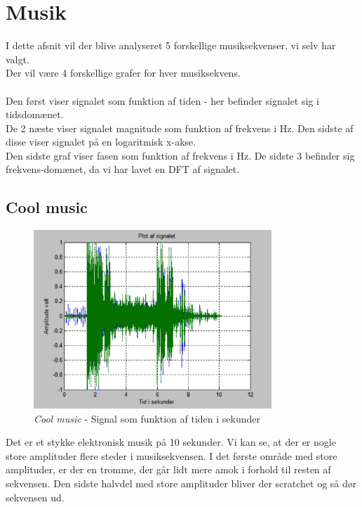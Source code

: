 \chapter{Musik}
I dette afsnit vil der blive analyseret 5 forskellige musiksekvenser, vi selv har valgt. \\
Der vil være 4 forskellige grafer for hver musiksekvens.\\ \\
Den først viser signalet som funktion af tiden - her befinder signalet sig i tidsdomænet. \\
De 2 næste viser signalet magnitude som funktion af frekvens i Hz. Den sidste af disse viser signalet på en logaritmisk x-akse. \\
Den sidste graf viser fasen som funktion af frekvens i Hz. De sidste 3 befinder sig frekvens-domænet, da vi har lavet en DFT af signalet.   

\section{Cool music}

\begin{figure}[H]
	\centering
	\includegraphics[width=0.8\textwidth]{Figurer/Snip20151001_3}
	\caption{\textit{Cool music} - Signal som funktion af tiden i sekunder}
\end{figure}

Det er et stykke elektronisk musik på 10 sekunder. Vi kan se, at der er nogle store amplituder flere steder i musiksekvensen. I det første område med store amplituder, er der en tromme, der går lidt mere amok i forhold til resten af sekvensen. Den sidste halvdel med store amplituder bliver der scratchet og så dør sekvensen ud.

